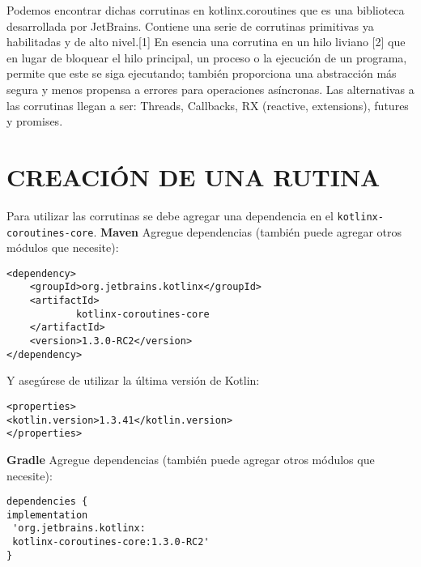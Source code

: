 \documentclass[twocolumn,10pt,abstract=on]{asme2ej}
\begin{document}
Podemos encontrar dichas corrutinas en kotlinx.coroutines que es  una biblioteca desarrollada por JetBrains. Contiene una serie de  corrutinas primitivas ya habilitadas y de alto nivel.[1]\linebreak\linebreak
En esencia una corrutina en un hilo liviano [2] que en lugar de bloquear el hilo principal, un proceso o la ejecución de un programa, permite que  este se siga ejecutando; también proporciona una abstracción más segura y menos propensa a errores para operaciones asíncronas. \linebreak\linebreak
Las alternativas a las corrutinas llegan a ser: Threads, Callbacks, RX (reactive, extensions), futures y promises.


\section{CREACIÓN DE UNA RUTINA}
Para utilizar las corrutinas se debe agregar una dependencia en el \verb+kotlinx-coroutines-core+.\linebreak\linebreak
\textbf{%
	\large {Maven}}
\linebreak
Agregue dependencias (también puede agregar otros módulos que necesite):

\begin{verbatim}
<dependency>                                                             
	<groupId>org.jetbrains.kotlinx</groupId>                              
	<artifactId>
			kotlinx-coroutines-core
	</artifactId>
	<version>1.3.0-RC2</version>
</dependency>
\end{verbatim}

Y asegúrese de utilizar la última versión de Kotlin:

\begin{verbatim}
<properties>
<kotlin.version>1.3.41</kotlin.version>
</properties>
\end{verbatim}

\smallbreak
\textbf{%
	\large {Gradle}}
\linebreak
Agregue dependencias (también puede agregar otros módulos que necesite):


\begin{verbatim}
dependencies {
implementation
 'org.jetbrains.kotlinx:
 kotlinx-coroutines-core:1.3.0-RC2'
}
\end{verbatim}
\end{document}
